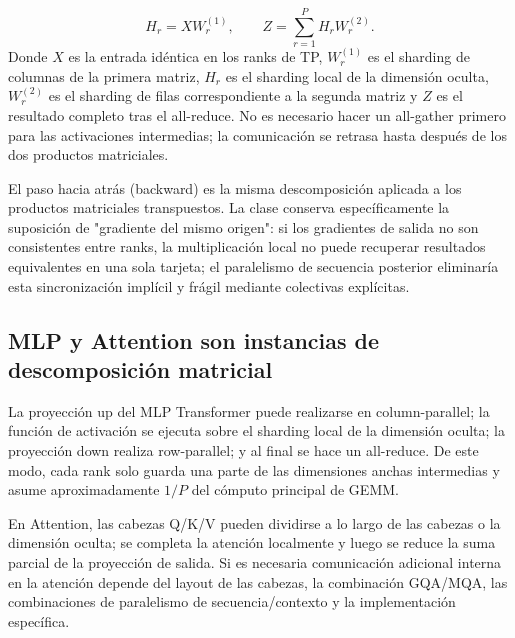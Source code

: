 \[
H_r=XW^{(1)}_r,
\qquad
Z=\sum_{r=1}^{P} H_rW^{(2)}_r.
\]
Donde $X$ es la entrada idéntica en los ranks de TP, $W^{(1)}_r$ es el sharding de columnas de la primera matriz, $H_r$ es el sharding local de la dimensión oculta, $W^{(2)}_r$ es el sharding de filas correspondiente a la segunda matriz y $Z$ es el resultado completo tras el all-reduce. No es necesario hacer un all-gather primero para las activaciones intermedias; la comunicación se retrasa hasta después de los dos productos matriciales.


El paso hacia atrás (backward) es la misma descomposición aplicada a los productos matriciales transpuestos. La clase conserva específicamente la suposición de "gradiente del mismo origen": si los gradientes de salida no son consistentes entre ranks, la multiplicación local no puede recuperar resultados equivalentes en una sola tarjeta; el paralelismo de secuencia posterior eliminaría esta sincronización implícil y frágil mediante colectivas explícitas.


\subsection{MLP y Attention son instancias de descomposición matricial}

La proyección up del MLP Transformer puede realizarse en column-parallel; la función de activación se ejecuta sobre el sharding local de la dimensión oculta; la proyección down realiza row-parallel; y al final se hace un all-reduce. De este modo, cada rank solo guarda una parte de las dimensiones anchas intermedias y asume aproximadamente $1/P$ del cómputo principal de GEMM.


En Attention, las cabezas Q/K/V pueden dividirse a lo largo de las cabezas o la dimensión oculta; se completa la atención localmente y luego se reduce la suma parcial de la proyección de salida. Si es necesaria comunicación adicional interna en la atención depende del layout de las cabezas, la combinación GQA/MQA, las combinaciones de paralelismo de secuencia/contexto y la implementación específica.

